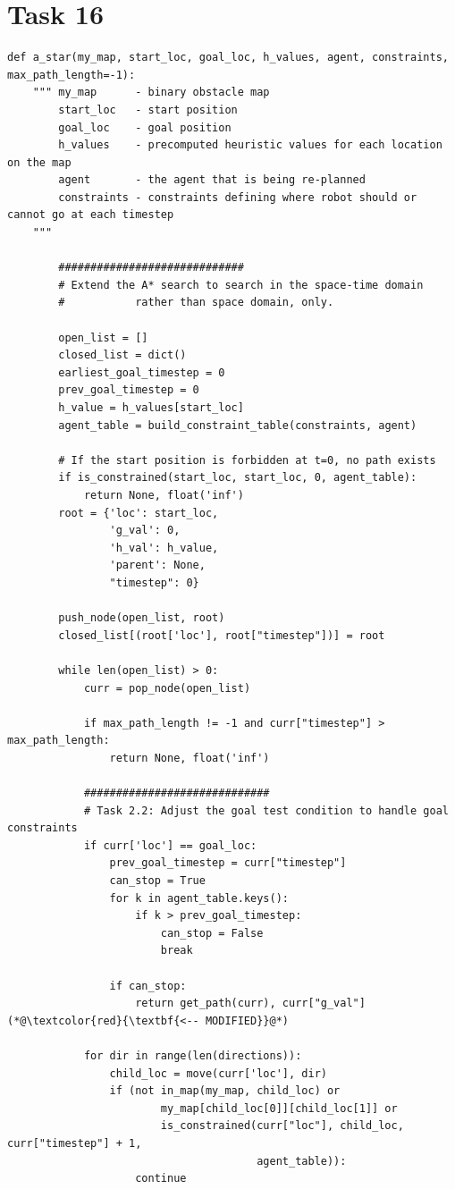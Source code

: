 \documentclass[11pt]{article}
\begin{document}
\section*{Task 16}
    \begin{lstlisting}
def a_star(my_map, start_loc, goal_loc, h_values, agent, constraints, max_path_length=-1):
    """ my_map      - binary obstacle map
        start_loc   - start position
        goal_loc    - goal position
        h_values    - precomputed heuristic values for each location on the map
        agent       - the agent that is being re-planned
        constraints - constraints defining where robot should or cannot go at each timestep
    """

        #############################
        # Extend the A* search to search in the space-time domain
        #           rather than space domain, only.

        open_list = []
        closed_list = dict()
        earliest_goal_timestep = 0
        prev_goal_timestep = 0
        h_value = h_values[start_loc]
        agent_table = build_constraint_table(constraints, agent)

        # If the start position is forbidden at t=0, no path exists
        if is_constrained(start_loc, start_loc, 0, agent_table):
            return None, float('inf')
        root = {'loc': start_loc,
                'g_val': 0,
                'h_val': h_value,
                'parent': None,
                "timestep": 0}

        push_node(open_list, root)
        closed_list[(root['loc'], root["timestep"])] = root

        while len(open_list) > 0:
            curr = pop_node(open_list)

            if max_path_length != -1 and curr["timestep"] > max_path_length:
                return None, float('inf')

            #############################
            # Task 2.2: Adjust the goal test condition to handle goal constraints
            if curr['loc'] == goal_loc:
                prev_goal_timestep = curr["timestep"]
                can_stop = True
                for k in agent_table.keys():
                    if k > prev_goal_timestep:
                        can_stop = False
                        break

                if can_stop:
                    return get_path(curr), curr["g_val"]  (*@\textcolor{red}{\textbf{<-- MODIFIED}}@*)

            for dir in range(len(directions)):
                child_loc = move(curr['loc'], dir)
                if (not in_map(my_map, child_loc) or
                        my_map[child_loc[0]][child_loc[1]] or
                        is_constrained(curr["loc"], child_loc, curr["timestep"] + 1,
                                       agent_table)):
                    continue


\end{lstlisting}
\end{document}
